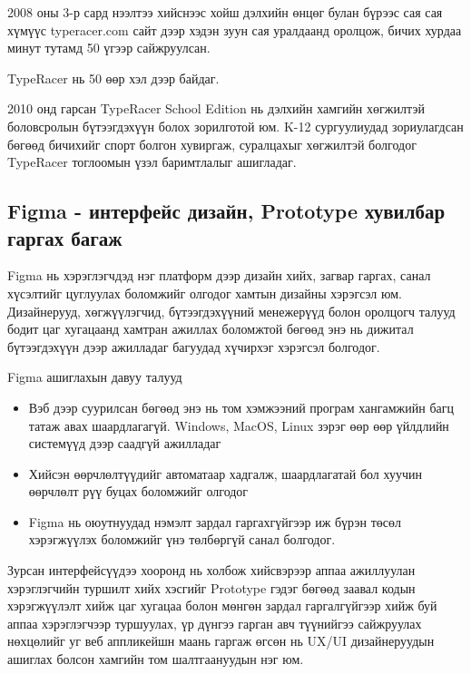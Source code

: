 2008 оны 3-р сард нээлтээ хийснээс хойш дэлхийн өнцөг булан бүрээс сая сая хүмүүс typeracer.com сайт дээр хэдэн зуун сая уралдаанд оролцож, бичих хурдаа минут тутамд 50 үгээр сайжруулсан.

TypeRacer нь 50 өөр хэл дээр байдаг.

2010 онд гарсан TypeRacer School Edition нь дэлхийн хамгийн хөгжилтэй боловсролын бүтээгдэхүүн болох зорилготой юм. K-12 сургуулиудад зориулагдсан бөгөөд бичихийг спорт болгон хувиргаж, суралцахыг хөгжилтэй болгодог TypeRacer тоглоомын үзэл баримтлалыг ашигладаг.

\subsection{Figma - интерфейс дизайн, Prototype хувилбар гаргах багаж}
Figma нь хэрэглэгчдэд нэг платформ дээр дизайн хийх, загвар гаргах, санал хүсэлтийг цуглуулах боломжийг олгодог хамтын дизайны хэрэгсэл юм. Дизайнерууд, хөгжүүлэгчид, бүтээгдэхүүний менежерүүд болон оролцогч талууд бодит цаг хугацаанд хамтран ажиллах боломжтой бөгөөд энэ нь дижитал бүтээгдэхүүн дээр ажилладаг багуудад хүчирхэг хэрэгсэл болгодог.

Figma ашиглахын давуу талууд
\begin{itemize}
	\item Вэб дээр суурилсан бөгөөд энэ нь том хэмжээний програм хангамжийн багц татаж авах шаардлагагүй. Windows, MacOS, Linux зэрэг өөр өөр үйлдлийн системүүд дээр саадгүй ажилладаг
	\item Хийсэн өөрчлөлтүүдийг автоматаар хадгалж, шаардлагатай бол хуучин өөрчлөлт рүү буцах боломжийг олгодог
	\item Figma нь оюутнуудад нэмэлт зардал гаргахгүйгээр иж бүрэн төсөл хэрэгжүүлэх боломжийг үнэ төлбөргүй санал болгодог.
\end{itemize}


Зурсан интерфейсүүдээ хооронд нь холбож хийсвэрээр аппаа ажиллуулан хэрэглэгчийн туршилт хийх хэсгийг Prototype гэдэг бөгөөд заавал кодын хэрэгжүүлэлт хийж цаг хугацаа болон мөнгөн зардал гаргалгүйгээр хийж буй аппаа хэрэглэгчээр туршуулах, үр дүнгээ гарган авч түүнийгээ сайжруулах нөхцөлийг уг веб аппликейшн маань гаргаж өгсөн нь UX/UI дизайнеруудын ашиглах болсон хамгийн том шалтгаануудын нэг юм.
